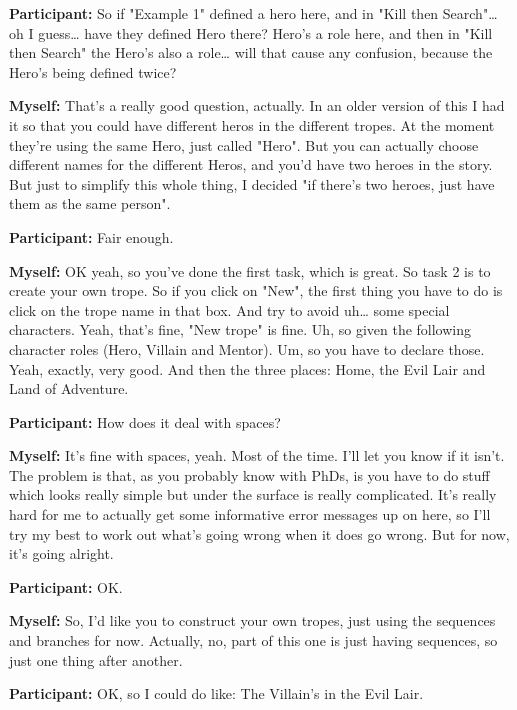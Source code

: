 \documentclass[11pt]{report}
\newcommand{\llabel}[1]{\hypertarget{llineno:#1}{\linelabel{#1}}}
\begin{document}
\begin{linenumbers}
\textbf{Participant:} So if "Example 1" defined a hero here, and in "Kill then
Search"\ldots{} oh I guess\ldots{} have they defined Hero there? Hero's a role
here, and then in "Kill then Search" the Hero's also a role\ldots{} will that
cause any confusion, because the Hero's being defined twice?\llabel{lne:feature1a}

\textbf{Myself:} That's a really good question, actually. In an older version of this I had it so that you could have different heros in the different tropes. At the moment they're using the same Hero, just called "Hero". But you can actually choose different names for the different Heros, and you'd have two heroes in the story. But just to simplify this whole thing, I decided "if there's two heroes, just have them as the same person".

\textbf{Participant:} Fair enough.

\textbf{Myself:} OK yeah, so you've done the first task, which is great. So task 2 is to create your own trope. So if you click on "New", the first thing you have to do is click on the trope name in that box. And try to avoid uh\ldots{} some special characters. Yeah, that's fine, "New trope" is fine. Uh, so given the following character roles (Hero, Villain and Mentor). Um, so you have to declare those. Yeah, exactly, very good. And then the three places: Home, the Evil Lair and Land of Adventure.

\textbf{Participant:} How does it deal with spaces?\llabel{lne:syntax1a}

\textbf{Myself:} It's fine with spaces, yeah. Most of the time. I'll let you know if it isn't. The problem is that, as you probably know with PhDs, is you have to do stuff which looks really simple but under the surface is really complicated. It's really hard for me to actually get some informative error messages up on here, so I'll try my best to work out what's going wrong when it does go wrong. But for now, it's going alright.

\textbf{Participant:} OK.

\textbf{Myself:} So, I'd like you to construct your own tropes, just using the sequences and branches for now. Actually, no, part of this one is just having sequences, so just one thing after another.

\textbf{Participant:} OK, so I could do like: The Villain's in the Evil
Lair.\llabel{lne:feature2a}


\end{linenumbers}
\end{document}
